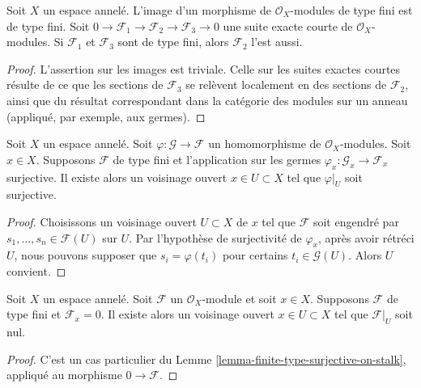 \begin{lemma}
\label{lemma-extension-finite-type}
Soit $X$ un espace annelé. L'image d'un morphisme de
$\mathcal{O}_X$-modules de type fini est de type fini. Soit
$0 \to \mathcal{F}_1 \to \mathcal{F}_2 \to \mathcal{F}_3 \to 0$
une suite exacte courte de $\mathcal{O}_X$-modules. Si $\mathcal{F}_1$ et
$\mathcal{F}_3$ sont de type fini, alors $\mathcal{F}_2$ l'est aussi.
\end{lemma}

\begin{proof}
L'assertion sur les images est triviale. Celle sur les suites exactes courtes
résulte de ce que les sections de $\mathcal{F}_3$ se relèvent localement en
des sections de $\mathcal{F}_2$, ainsi que du résultat correspondant dans la
catégorie des modules sur un anneau (appliqué, par exemple, aux germes).
\end{proof}

\begin{lemma}
\label{lemma-finite-type-surjective-on-stalk}
Soit $X$ un espace annelé. Soit
$\varphi : \mathcal{G} \to \mathcal{F}$ un homomorphisme de
$\mathcal{O}_X$-modules. Soit $x \in X$. Supposons $\mathcal{F}$ de type fini
et l'application sur les germes
$\varphi_x : \mathcal{G}_x \to \mathcal{F}_x$ surjective. Il existe alors un
voisinage ouvert $x \in U \subset X$ tel que $\varphi|_U$ soit surjective.
\end{lemma}

\begin{proof}
Choisissons un voisinage ouvert $U \subset X$ de $x$ tel que $\mathcal{F}$
soit engendré par $s_1, \ldots, s_n \in \mathcal{F}(U)$ sur $U$. Par
l'hypothèse de surjectivité de $\varphi_x$, après avoir rétréci $U$, nous
pouvons supposer que $s_i = \varphi(t_i)$ pour certains
$t_i \in \mathcal{G}(U)$. Alors $U$ convient.
\end{proof}

\begin{lemma}
\label{lemma-finite-type-stalk-zero}
Soit $X$ un espace annelé. Soit $\mathcal{F}$ un
$\mathcal{O}_X$-module et soit $x \in X$. Supposons $\mathcal{F}$ de type
fini et $\mathcal{F}_x = 0$. Il existe alors un voisinage ouvert
$x \in U \subset X$ tel que $\mathcal{F}|_U$ soit nul.
\end{lemma}

\begin{proof}
C'est un cas particulier du Lemme
\ref{lemma-finite-type-surjective-on-stalk}, appliqué au morphisme
$0 \to \mathcal{F}$.
\end{proof}

